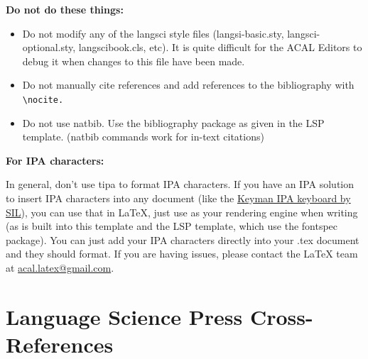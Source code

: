 \documentclass[output=paper,colorlinks,citecolor=brown,
]{langscibook}
\begin{document}
\newpage 

\noindent \textbf{Do not do these things:}

\begin{itemize}

\item Do not modify any of the langsci style files (langsi-basic.sty, langsci-optional.sty, langscibook.cls, etc). It is quite difficult for the ACAL Editors to debug it when changes to this file have been made. 

\item Do not manually cite references and add references to the bibliography with \verb|\nocite.| 

\item Do not use natbib. Use the bibliography package as given in the LSP template. (natbib commands work for in-text citations)

\end{itemize}

\noindent \textbf{For IPA characters:}

In general, don’t use tipa to format IPA characters. If you have an IPA solution to insert IPA characters into any document (like the \href{https://keyman.com/ipa/}{Keyman IPA keyboard by SIL}), you can use that in \LaTeX{}, just use \XeLaTeX{} as your rendering engine when writing (as is built into this template and the LSP template, which use the fontspec package). You can just add your IPA characters directly into your .tex document and they should format. If you are having issues, please contact the LaTeX team at \href{mailto:acal.latex@gmail.com}{acal.latex@gmail.com}.

\section{Language Science Press Cross-References} \label{sec:diercks:CrossReferences}
\end{document}
